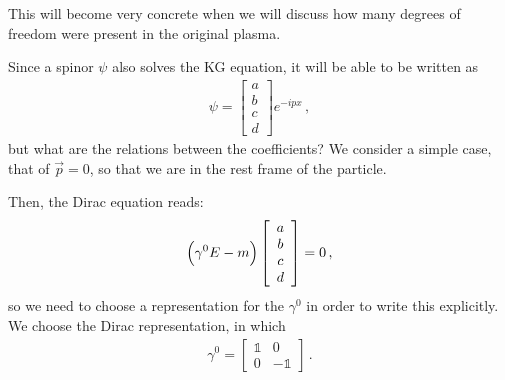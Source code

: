 \documentclass[main.tex]{subfiles}
\begin{document}
This will become very concrete when we will discuss how many degrees of freedom were present in the original plasma. 

Since a spinor \(\psi \) also solves the KG equation, it will be able to be written as 
%
\begin{subequations}
\begin{align}
\psi = \left[\begin{array}{c}
a \\ 
b \\ 
c \\ 
d
\end{array}\right] e^{-i px}
\,,
\end{align}
\end{subequations}
%
but what are the relations between the coefficients? 
We consider a simple case, that of \(\vec{p} =0\), so that we are in the rest frame of the particle. 

Then, the Dirac equation reads: 
%
\begin{subequations}
\begin{align}
\qty(\gamma^{0}E - m ) \left[\begin{array}{c}
a \\ 
b \\ 
c \\ 
d
\end{array}\right]=0
\,,
\end{align}
\end{subequations}
%
so we need to choose a representation for the \(\gamma^{0}\) in order to write this explicitly. We choose the Dirac representation, in which 
%
\begin{subequations}
\begin{align}
\gamma^{0} = \left[\begin{array}{cc}
\mathbb{1} & 0 \\ 
0 & -\mathbb{1}
\end{array}\right]
\,.
\end{align}
\end{subequations}
\end{document}
